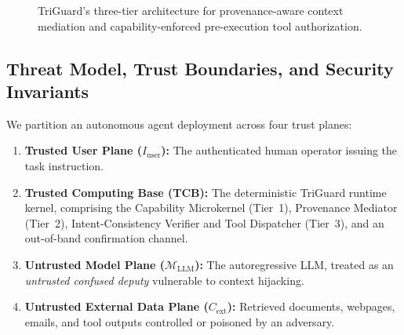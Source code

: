 \documentclass[conference]{IEEEtran}
\begin{document}
\begin{figure}[t]
\caption{TriGuard's three-tier architecture for provenance-aware context mediation and capability-enforced pre-execution tool authorization.}
\label{fig:arch}
\end{figure}

\subsection{Threat Model, Trust Boundaries, and Security Invariants}
We partition an autonomous agent deployment across four trust planes:
\begin{enumerate}
    \item \textbf{Trusted User Plane ($I_{\text{user}}$):} The authenticated human operator issuing the task instruction.
    \item \textbf{Trusted Computing Base (TCB):} The deterministic TriGuard runtime kernel, comprising the Capability Microkernel (Tier~1), Provenance Mediator (Tier~2), Intent-Consistency Verifier and Tool Dispatcher (Tier~3), and an out-of-band confirmation channel.
    \item \textbf{Untrusted Model Plane ($\mathcal{M}_{\text{LLM}}$):} The autoregressive LLM, treated as an \emph{untrusted confused deputy} vulnerable to context hijacking.
    \item \textbf{Untrusted External Data Plane ($C_{\text{ext}}$):} Retrieved documents, webpages, emails, and tool outputs controlled or poisoned by an adversary.
\end{enumerate}
\end{document}
